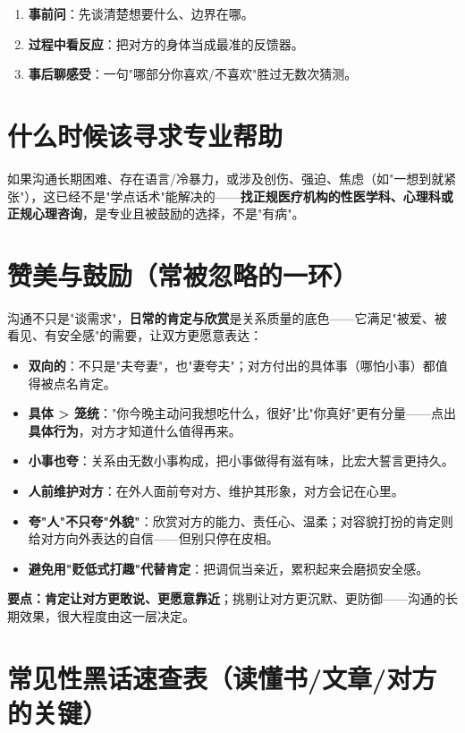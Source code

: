 \documentclass[12pt,UTF8,openany]{ctexbook}
\begin{document}
\begin{enumerate}[leftmargin=2em,itemsep=0.3em]
  \item \textbf{事前问}：先谈清楚想要什么、边界在哪。
  \item \textbf{过程中看反应}：把对方的身体当成最准的反馈器。
  \item \textbf{事后聊感受}：一句"哪部分你喜欢/不喜欢"胜过无数次猜测。
\end{enumerate}

\section{什么时候该寻求专业帮助}

如果沟通长期困难、存在语言/冷暴力，或涉及创伤、强迫、焦虑（如"一想到就紧张"），这已经不是"学点话术"能解决的——\textbf{找正规医疗机构的性医学科、心理科或正规心理咨询}，是专业且被鼓励的选择，不是"有病"。

\section{赞美与鼓励（常被忽略的一环）}

\noindent 沟通不只是"谈需求"，\textbf{日常的肯定与欣赏}是关系质量的底色——它满足"被爱、被看见、有安全感"的需要，让双方更愿意表达：

\begin{itemize}[leftmargin=2em,itemsep=0.3em]
  \item \textbf{双向的}：不只是"夫夸妻"，也"妻夸夫"；对方付出的具体事（哪怕小事）都值得被点名肯定。
  \item \textbf{具体 > 笼统}："你今晚主动问我想吃什么，很好"比"你真好"更有分量——点出\textbf{具体行为}，对方才知道什么值得再来。
  \item \textbf{小事也夸}：关系由无数小事构成，把小事做得有滋有味，比宏大誓言更持久。
  \item \textbf{人前维护对方}：在外人面前夸对方、维护其形象，对方会记在心里。
  \item \textbf{夸"人"不只夸"外貌"}：欣赏对方的能力、责任心、温柔；对容貌打扮的肯定则给对方向外表达的自信——但别只停在皮相。
  \item \textbf{避免用"贬低式打趣"代替肯定}：把调侃当亲近，累积起来会磨损安全感。
\end{itemize}

\noindent \textbf{要点：}\textbf{肯定让对方更敢说、更愿意靠近}；挑剔让对方更沉默、更防御——沟通的长期效果，很大程度由这一层决定。

\section{常见性黑话速查表（读懂书/文章/对方的关键）}
\end{document}
